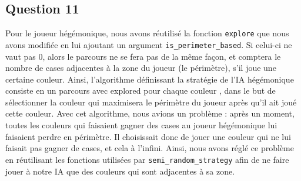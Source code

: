 \documentclass{article}
\begin{document}
\subsection{Question 11}
    Pour le joueur hégémonique, nous avons réutilisé la fonction \texttt{explore} que nous avons modifiée en lui ajoutant un argument \texttt{is\_perimeter\_based}. Si celui-ci ne vaut pas 0, alors le parcours ne se fera pas de la même façon, et comptera le nombre de cases adjacentes à la zone du joueur (le périmètre), s'il joue une certaine couleur. Ainsi, l'algorithme définissant la stratégie de l'IA hégémonique consiste en un parcours avec explored pour chaque couleur , dans le but de sélectionner la couleur qui maximisera le périmètre du joueur après qu'il ait joué cette couleur. Avec cet algorithme, nous avions un problème : après un moment, toutes les couleurs qui faisaient gagner des cases au joueur hégémonique lui faisaient perdre en périmètre. Il choisissait donc de jouer une couleur qui ne lui faisait pas gagner de cases, et cela à l'infini. Ainsi, nous avons réglé ce problème en réutilisant les fonctions utilisées par \texttt{semi\_random\_strategy} afin de ne faire jouer à notre IA que des couleurs qui sont adjacentes à sa zone.
\end{document}

